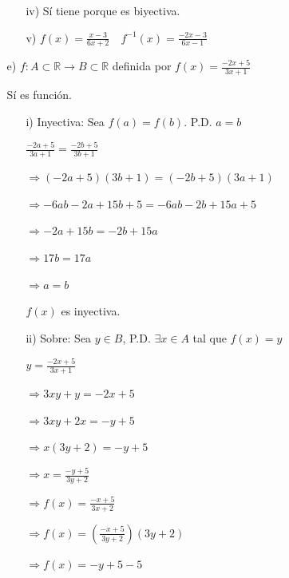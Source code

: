 \documentclass{article}
\begin{document}
\begin{enumerate}
\begin{enumerate}
\begin{enumerate}
            \item[iv)] Sí tiene porque es biyectiva.

            \item[v)] \(f(x) = \frac{x - 3}{6x + 2} \quad f^{-1}(x) = \frac{-2x - 3}{6x - 1}\)
        \end{enumerate}
        \item[e)] \(f:A\subset\mathbb{R}\rightarrow B\subset\mathbb{R}\) definida por \(f(x)=\frac{-2x+5}{3x+1}\)

        Sí es función.
        \vspace{\baselineskip}
        
        \begin{enumerate}
            \item[i)] Inyectiva: Sea \(f(a) = f(b)\). P.D. \(a = b\)
            
            \(\frac{-2a + 5}{3a + 1} = \frac{-2b + 5}{3b + 1}\)
            
            \(\Rightarrow (-2a + 5)(3b + 1) = (-2b + 5)(3a + 1)\)
            
            \(\Rightarrow -6ab - 2a + 15b + 5 = -6ab - 2b + 15a + 5\)
            
            \(\Rightarrow -2a + 15b = -2b + 15a\)
            
            \(\Rightarrow 17b = 17a\)
            
            \(\Rightarrow a = b\)
            
            \(f(x)\) es inyectiva.
            
            \item[ii)] Sobre: Sea \(y \in B\), P.D. \(\exists x \in A\) tal que \(f(x) = y\)
            
            \(y = \frac{-2x + 5}{3x + 1}\)
            
            \(\Rightarrow 3xy + y = -2x + 5\)
            
            \(\Rightarrow 3xy + 2x = -y + 5\)
            
            \(\Rightarrow x(3y + 2) = -y + 5\)
            
            \(\Rightarrow x = \frac{-y + 5}{3y + 2}\)
            
            \(\Rightarrow f(x) = \frac{-x + 5}{3x + 2}\)
            
            \(\Rightarrow f(x) = \left(\frac{-x + 5}{3y + 2}\right)(3y + 2)\)
            
            \(\Rightarrow f(x) = -y + 5 - 5\)
            

\end{enumerate}
\end{enumerate}
\end{enumerate}
\end{document}
